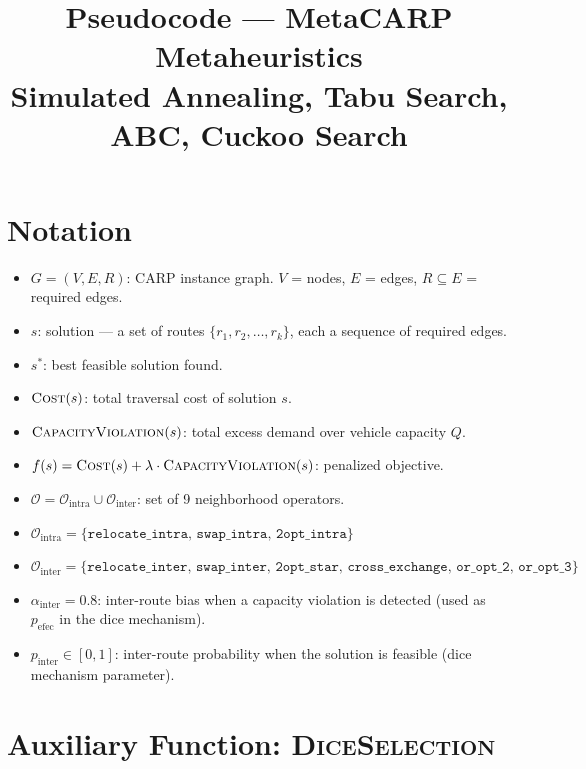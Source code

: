 \documentclass[12pt, a4paper]{article}
\title{Pseudocode — MetaCARP Metaheuristics\\
       \large Simulated Annealing, Tabu Search, ABC, Cuckoo Search}
\author{}
\date{}
\begin{document}
\maketitle
\tableofcontents
\newpage

\section{Notation}

\begin{itemize}
    \item $G = (V, E, R)$: CARP instance graph. $V$ = nodes, $E$ = edges, $R \subseteq E$ = required edges.
    \item $s$: solution — a set of routes $\{r_1, r_2, \ldots, r_k\}$, each a sequence of required edges.
    \item $s^{*}$: best feasible solution found.
    \item $\textsc{Cost}(s)$: total traversal cost of solution $s$.
    \item $\textsc{CapacityViolation}(s)$: total excess demand over vehicle capacity $Q$.
    \item $f(s) = \textsc{Cost}(s) + \lambda \cdot \textsc{CapacityViolation}(s)$: penalized objective.
    \item $\mathcal{O} = \mathcal{O}_{\mathrm{intra}} \cup \mathcal{O}_{\mathrm{inter}}$: set of 9 neighborhood operators.
    \item $\mathcal{O}_{\mathrm{intra}} = \{\texttt{relocate\_intra},\, \texttt{swap\_intra},\, \texttt{2opt\_intra}\}$
    \item $\mathcal{O}_{\mathrm{inter}} = \{\texttt{relocate\_inter},\, \texttt{swap\_inter},\, \texttt{2opt\_star},\, \texttt{cross\_exchange},\, \texttt{or\_opt\_2},\, \texttt{or\_opt\_3}\}$
    \item $\alpha_{\mathrm{inter}} = 0.8$: inter-route bias when a capacity violation is detected (used as $p_{\mathrm{efec}}$ in the dice mechanism).
    \item $p_{\mathrm{inter}} \in [0,1]$: inter-route probability when the solution is feasible (dice mechanism parameter).
\end{itemize}

\section{Auxiliary Function: \textsc{DiceSelection}}
\end{document}
